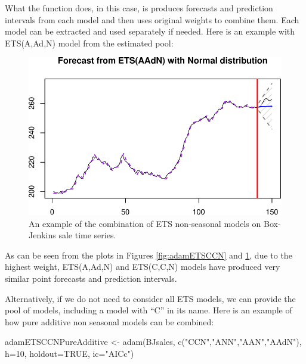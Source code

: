 \documentclass[
]{book}
\newenvironment{Shaded}{\begin{snugshade}}{\end{snugshade}}
\newcommand{\AttributeTok}[1]{\textcolor[rgb]{0.77,0.63,0.00}{#1}}
\newcommand{\ConstantTok}[1]{\textcolor[rgb]{0.00,0.00,0.00}{#1}}
\newcommand{\DecValTok}[1]{\textcolor[rgb]{0.00,0.00,0.81}{#1}}
\newcommand{\FunctionTok}[1]{\textcolor[rgb]{0.00,0.00,0.00}{#1}}
\newcommand{\NormalTok}[1]{#1}
\newcommand{\OtherTok}[1]{\textcolor[rgb]{0.56,0.35,0.01}{#1}}
\newcommand{\SpecialCharTok}[1]{\textcolor[rgb]{0.00,0.00,0.00}{#1}}
\newcommand{\StringTok}[1]{\textcolor[rgb]{0.31,0.60,0.02}{#1}}
\theoremstyle{definition}
\theoremstyle{definition}
\theoremstyle{definition}
\theoremstyle{definition}
\theoremstyle{remark}
\begin{document}
What the function does, in this case, is produces forecasts and prediction intervals from each model and then uses original weights to combine them. Each model can be extracted and used separately if needed. Here is an example with ETS(A,Ad,N) model from the estimated pool:

\begin{Shaded}
\end{Shaded}

\begin{figure}
\centering
\includegraphics{Svetunkov--2022----ADAM_files/figure-latex/adamETSCCNAAdN-1.pdf}
\caption{\label{fig:adamETSCCNAAdN}An example of the combination of ETS non-seasonal models on Box-Jenkins sale time series.}
\end{figure}

As can be seen from the plots in Figures \ref{fig:adamETSCCN} and \ref{fig:adamETSCCNAAdN}, due to the highest weight, ETS(A,Ad,N) and ETS(C,C,N) models have produced very similar point forecasts and prediction intervals.

Alternatively, if we do not need to consider all ETS models, we can provide the pool of models, including a model with ``C'' in its name. Here is an example of how pure additive non seasonal models can be combined:

\begin{Shaded}
\begin{Highlighting}[]
\NormalTok{adamETSCCNPureAdditive }\OtherTok{\textless{}{-}} \FunctionTok{adam}\NormalTok{(BJsales, }
                               \FunctionTok{c}\NormalTok{(}\StringTok{"CCN"}\NormalTok{,}\StringTok{"ANN"}\NormalTok{,}\StringTok{"AAN"}\NormalTok{,}\StringTok{"AAdN"}\NormalTok{), }
                               \AttributeTok{h=}\DecValTok{10}\NormalTok{, }\AttributeTok{holdout=}\ConstantTok{TRUE}\NormalTok{,}
                               \AttributeTok{ic=}\StringTok{"AICc"}\NormalTok{)}
\end{Highlighting}
\end{Shaded}
\end{document}
